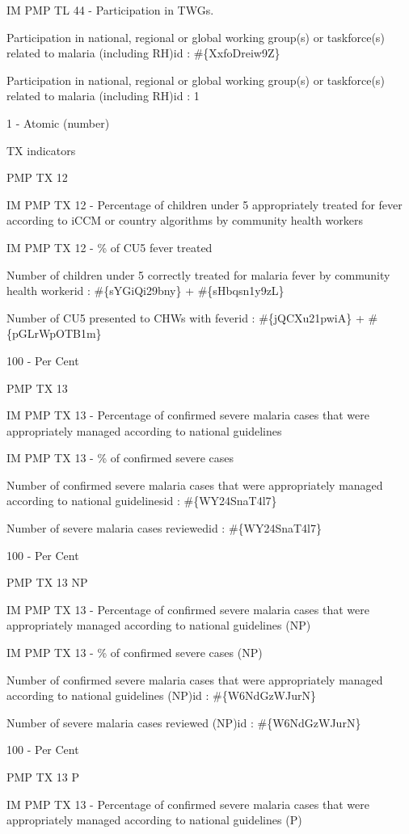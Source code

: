 \documentclass[]{book}
\begin{document}
IM PMP TL 44 - Participation in TWGs.

Participation in national, regional or global working group(s) or taskforce(s) related to malaria (including RH)id : \#\{XxfoDreiw9Z\}

Participation in national, regional or global working group(s) or taskforce(s) related to malaria (including RH)id : 1

1 - Atomic (number)

TX indicators

PMP TX 12

IM PMP TX 12 - Percentage of children under 5 appropriately treated for fever according to iCCM or country algorithms by community health workers

IM PMP TX 12 - \% of CU5 fever treated

Number of children under 5 correctly treated for malaria fever by community health workerid : \#\{sYGiQi29bny\} + \#\{sHbqsn1y9zL\}

Number of CU5 presented to CHWs with feverid : \#\{jQCXu21pwiA\} + \#\{pGLrWpOTB1m\}

100 - Per Cent

PMP TX 13

IM PMP TX 13 - Percentage of confirmed severe malaria cases that were appropriately managed according to national guidelines

IM PMP TX 13 - \% of confirmed severe cases

Number of confirmed severe malaria cases that were appropriately managed according to national guidelinesid : \#\{WY24SnaT4l7\}

Number of severe malaria cases reviewedid : \#\{WY24SnaT4l7\}

100 - Per Cent

PMP TX 13 NP

IM PMP TX 13 - Percentage of confirmed severe malaria cases that were appropriately managed according to national guidelines (NP)

IM PMP TX 13 - \% of confirmed severe cases (NP)

Number of confirmed severe malaria cases that were appropriately managed according to national guidelines (NP)id : \#\{W6NdGzWJurN\}

Number of severe malaria cases reviewed (NP)id : \#\{W6NdGzWJurN\}

100 - Per Cent

PMP TX 13 P

IM PMP TX 13 - Percentage of confirmed severe malaria cases that were appropriately managed according to national guidelines (P)
\end{document}

